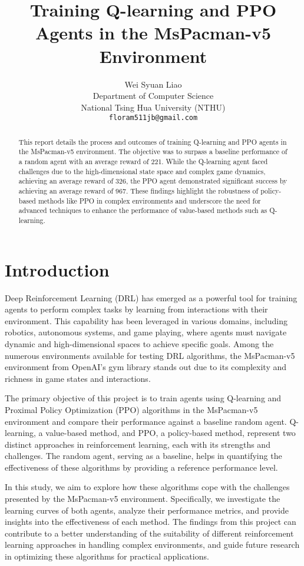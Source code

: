 \documentclass[final,numbers]{article}
\title{Training Q-learning and PPO Agents in the MsPacman-v5 Environment}
\author{%
  Wei Syuan Liao \\
  Department of Computer Science\\
  National Tsing Hua University (NTHU)\\
  \texttt{floram511jb@gmail.com} \\
}
\begin{document}
\maketitle

\begin{abstract}
This report details the process and outcomes of training Q-learning and PPO agents in the MsPacman-v5 environment. The objective was to surpass a baseline performance of a random agent with an average reward of 221. While the Q-learning agent faced challenges due to the high-dimensional state space and complex game dynamics, achieving an average reward of 326, the PPO agent demonstrated significant success by achieving an average reward of 967. These findings highlight the robustness of policy-based methods like PPO in complex environments and underscore the need for advanced techniques to enhance the performance of value-based methods such as Q-learning.
\end{abstract}

\section{Introduction}
Deep Reinforcement Learning (DRL) has emerged as a powerful tool for training agents to perform complex tasks by learning from interactions with their environment. This capability has been leveraged in various domains, including robotics, autonomous systems, and game playing, where agents must navigate dynamic and high-dimensional spaces to achieve specific goals. Among the numerous environments available for testing DRL algorithms, the MsPacman-v5 environment from OpenAI's gym library stands out due to its complexity and richness in game states and interactions.

The primary objective of this project is to train agents using Q-learning and Proximal Policy Optimization (PPO) algorithms in the MsPacman-v5 environment and compare their performance against a baseline random agent. Q-learning, a value-based method, and PPO, a policy-based method, represent two distinct approaches in reinforcement learning, each with its strengths and challenges. The random agent, serving as a baseline, helps in quantifying the effectiveness of these algorithms by providing a reference performance level.

In this study, we aim to explore how these algorithms cope with the challenges presented by the MsPacman-v5 environment. Specifically, we investigate the learning curves of both agents, analyze their performance metrics, and provide insights into the effectiveness of each method. The findings from this project can contribute to a better understanding of the suitability of different reinforcement learning approaches in handling complex environments, and guide future research in optimizing these algorithms for practical applications.
\end{document}
